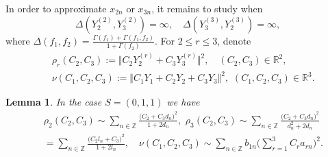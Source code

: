 \documentclass[preprint,12pt]{elsarticle}
\newtheorem{lem}[thm]{Lemma}
\numberwithin{equation}{section}
\begin{document}
%
In order
to approximate $x_{2n}$ or $x_{3n}$, 
it remains to study when  
\begin{equation}
\label{(011).m=3}
\Delta(Y_2^{(2)},Y_3^{(2)})=\infty,\quad \Delta(Y_3^{(3)},Y_2^{(3)})=\infty,
\end{equation}
%
 where $
\Delta(f_1,f_2)=\frac{\Gamma(f_1)+\Gamma(f_1,f_2)}{1+\Gamma(f_2)}$. For $2\leq r\leq 3$, 
denote 
%
\begin{eqnarray}
 \label{rho_r(C,C)}
 &&\rho_r(C_2,C_3):=\Vert C_2Y_2^{(r)}+C_3Y_3^{(r)}\Vert^2,\quad (C_2,C_3)\in \mathbb R^2,\\
 \label{nu(C,C,C)}
 &&\nu( C_1, C_2, C_3):=\Vert C_1Y_1+ C_2Y_2+C_3Y_3\Vert^2,
 \,\, (C_1,C_2,C_3)\in \mathbb R^3.\,\,\,
\end{eqnarray}
% 
\begin{lem}
\label{rho,nu,(011)} 
In the case $S=(0,1,1)$   
we have 
\begin{eqnarray}
  \label{rho_r-al-(011)}
&&\rho_2(C_2,C_3)\!\sim\!\sum_{n\in \mathbb Z}\frac{\big(C_2\!+\!C_3d_{n}\big)^2}{1+2d_n},\,\,
\rho_3(C_2,C_3)\!\sim\!\sum_{n\in \mathbb Z}\frac{\big(C_2\!+\!C_3d_{n}\big)^2}{d^2_{n}+2d_n}\,\,\,\,\,\\
%
\label{nu(CCC)} 
&&
=\sum_{n\in \mathbb Z}\frac{\big(C_2l_n\!+\!C_3\big)^2}{1+2l_n},\,\,\,
\,\,\,
\nu( C_1, C_2, C_3)\sim\sum_{n\in \mathbb Z}b_{1n}\Big(\sum_{r=1}^3C_ra_{rn}\Big)^2.
\end{eqnarray}
\end{lem}
\end{document}
